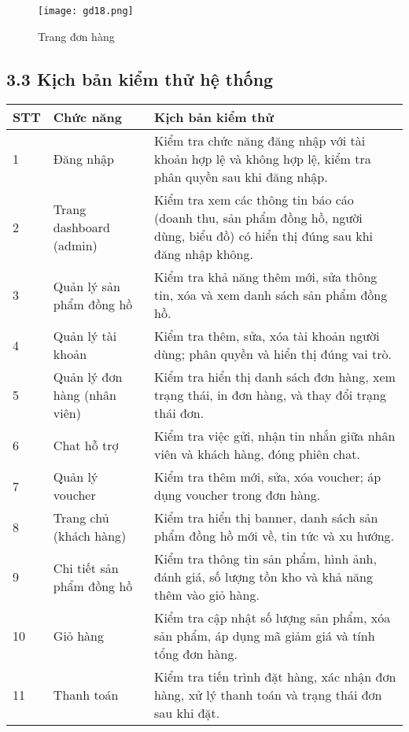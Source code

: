 \begin{figure}[H]
  \centering
  \texttt{[image: gd18.png]}
  \caption{Trang đơn hàng}
  \label{fig:customer-orders}
\end{figure}

\subsection*{\textbf{3.3 Kịch bản kiểm thử hệ thống}}

\begin{longtable}{|p{0.8cm}|p{5cm}|p{8cm}|}
\hline
\textbf{STT} & \textbf{Chức năng} & \textbf{Kịch bản kiểm thử} \\
\hline
1 & Đăng nhập & Kiểm tra chức năng đăng nhập với tài khoản hợp lệ và không hợp lệ, kiểm tra phân quyền sau khi đăng nhập. \\
\hline
2 & Trang dashboard (admin) & Kiểm tra xem các thông tin báo cáo (doanh thu, sản phẩm đồng hồ, người dùng, biểu đồ) có hiển thị đúng sau khi đăng nhập không. \\
\hline
3 & Quản lý sản phẩm đồng hồ & Kiểm tra khả năng thêm mới, sửa thông tin, xóa và xem danh sách sản phẩm đồng hồ. \\
\hline
4 & Quản lý tài khoản & Kiểm tra thêm, sửa, xóa tài khoản người dùng; phân quyền và hiển thị đúng vai trò. \\
\hline
5 & Quản lý đơn hàng (nhân viên) & Kiểm tra hiển thị danh sách đơn hàng, xem trạng thái, in đơn hàng, và thay đổi trạng thái đơn. \\
\hline
6 & Chat hỗ trợ & Kiểm tra việc gửi, nhận tin nhắn giữa nhân viên và khách hàng, đóng phiên chat. \\
\hline
7 & Quản lý voucher & Kiểm tra thêm mới, sửa, xóa voucher; áp dụng voucher trong đơn hàng. \\
\hline
8 & Trang chủ (khách hàng) & Kiểm tra hiển thị banner, danh sách sản phẩm đồng hồ mới về, tin tức và xu hướng. \\
\hline
9 & Chi tiết sản phẩm đồng hồ & Kiểm tra thông tin sản phẩm, hình ảnh, đánh giá, số lượng tồn kho và khả năng thêm vào giỏ hàng. \\
\hline
10 & Giỏ hàng & Kiểm tra cập nhật số lượng sản phẩm, xóa sản phẩm, áp dụng mã giảm giá và tính tổng đơn hàng. \\
\hline
11 & Thanh toán & Kiểm tra tiến trình đặt hàng, xác nhận đơn hàng, xử lý thanh toán và trạng thái đơn sau khi đặt. \\
\hline
\end{longtable}

